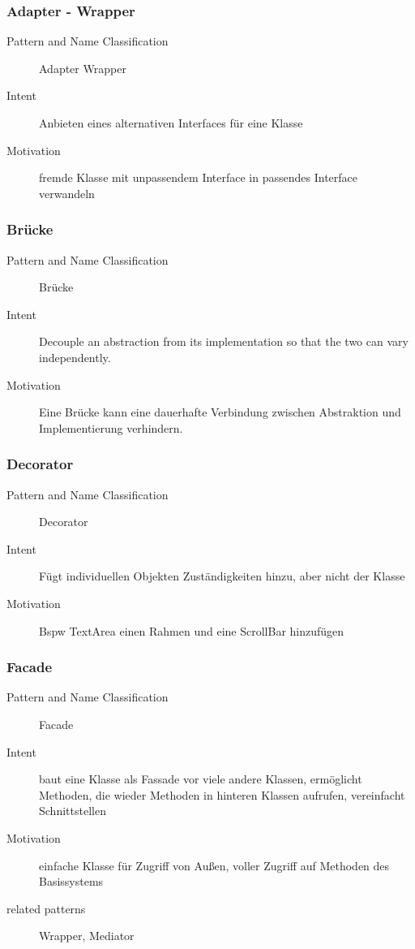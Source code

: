 \documentclass[a4paper, 10pt]{article}
\begin{document}
\subsubsection{Adapter - Wrapper}
\begin{description}
	\item[Pattern and Name Classification] Adapter Wrapper
	\item[Intent] Anbieten eines alternativen Interfaces für eine Klasse
	\item[Motivation] fremde Klasse mit unpassendem Interface in passendes Interface verwandeln
\end{description}

\subsubsection{Brücke}
\begin{description}
	\item[Pattern and Name Classification] Brücke
	\item[Intent] Decouple an abstraction from its implementation so that the two can vary independently.
	\item[Motivation] Eine Brücke kann eine dauerhafte Verbindung zwischen Abstraktion und Implementierung verhindern.
\end{description}

\subsubsection{Decorator}
\begin{description}
	\item[Pattern and Name Classification] Decorator
	\item[Intent] Fügt individuellen Objekten Zuständigkeiten hinzu, aber nicht der Klasse
	\item[Motivation] Bspw TextArea einen Rahmen und eine ScrollBar hinzufügen
\end{description}

\subsubsection{Facade}
\begin{description}
	\item[Pattern and Name Classification] Facade
	\item[Intent] baut eine Klasse als Fassade vor viele andere Klassen, ermöglicht Methoden, die wieder Methoden in hinteren Klassen aufrufen, vereinfacht Schnittstellen
	\item[Motivation] einfache Klasse für Zugriff von Außen, voller Zugriff auf Methoden des Basissystems
	\item[related patterns] Wrapper, Mediator
\end{description}
\end{document}
